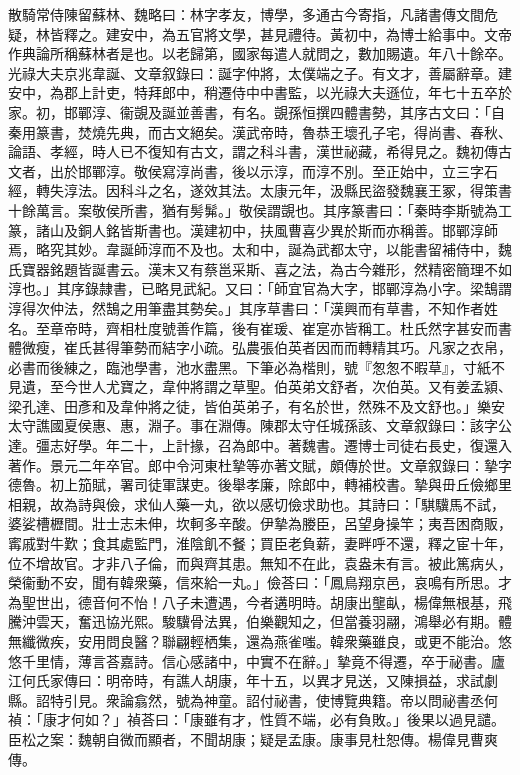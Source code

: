 \begin{pinyinscope}
散騎常侍陳留蘇林、魏略曰：林字孝友，博學，多通古今寄指，凡諸書傳文間危疑，林皆釋之。建安中，為五官將文學，甚見禮待。黃初中，為博士給事中。文帝作典論所稱蘇林者是也。以老歸第，國家每遣人就問之，數加賜遺。年八十餘卒。光祿大夫京兆韋誕、文章叙錄曰：誕字仲將，太僕端之子。有文才，善屬辭章。建安中，為郡上計吏，特拜郎中，稍遷侍中中書監，以光祿大夫遜位，年七十五卒於家。初，邯鄲淳、衞覬及誕並善書，有名。覬孫恒撰四體書勢，其序古文曰：「自秦用篆書，焚燒先典，而古文絕矣。漢武帝時，魯恭王壞孔子宅，得尚書、春秋、論語、孝經，時人已不復知有古文，謂之科斗書，漢世祕藏，希得見之。魏初傳古文者，出於邯鄲淳。敬侯寫淳尚書，後以示淳，而淳不別。至正始中，立三字石經，轉失淳法。因科斗之名，遂效其法。太康元年，汲縣民盜發魏襄王冢，得策書十餘萬言。案敬侯所書，猶有髣髴。」敬侯謂覬也。其序篆書曰：「秦時李斯號為工篆，諸山及銅人銘皆斯書也。漢建初中，扶風曹喜少異於斯而亦稱善。邯鄲淳師焉，略究其妙。韋誕師淳而不及也。太和中，誕為武都太守，以能書留補侍中，魏氏寶器銘題皆誕書云。漢末又有蔡邕采斯、喜之法，為古今雜形，然精密簡理不如淳也。」其序錄隷書，已略見武紀。又曰：「師宜官為大字，邯鄲淳為小字。梁鵠謂淳得次仲法，然鵠之用筆盡其勢矣。」其序草書曰：「漢興而有草書，不知作者姓名。至章帝時，齊相杜度號善作篇，後有崔瑗、崔寔亦皆稱工。杜氏然字甚安而書體微瘦，崔氏甚得筆勢而結字小疏。弘農張伯英者因而而轉精其巧。凡家之衣帛，必書而後練之，臨池學書，池水盡黑。下筆必為楷則，號『怱怱不暇草』，寸紙不見遺，至今世人尤寶之，韋仲將謂之草聖。伯英弟文舒者，次伯英。又有姜孟潁、梁孔達、田彥和及韋仲將之徒，皆伯英弟子，有名於世，然殊不及文舒也。」樂安太守譙國夏侯惠、惠，淵子。事在淵傳。陳郡太守任城孫該、文章叙錄曰：該字公達。彊志好學。年二十，上計掾，召為郎中。著魏書。遷博士司徒右長史，復還入著作。景元二年卒官。郎中令河東杜摯等亦著文賦，頗傳於世。文章叙錄曰：摯字德魯。初上笳賦，署司徒軍謀吏。後舉孝廉，除郎中，轉補校書。摯與毌丘儉鄉里相親，故為詩與儉，求仙人藥一丸，欲以感切儉求助也。其詩曰：「騏驥馬不試，婆娑槽櫪間。壯士志未伸，坎軻多辛酸。伊摯為媵臣，呂望身操竿；夷吾困商販，寗戚對牛歎；食其處監門，淮陰飢不餐；買臣老負薪，妻畔呼不還，釋之宦十年，位不增故官。才非八子倫，而與齊其患。無知不在此，袁盎未有言。被此篤病乆，榮衞動不安，聞有韓衆藥，信來給一丸。」儉荅曰：「鳳鳥翔京邑，哀鳴有所思。才為聖世出，德音何不怡！八子未遭遇，今者遘明時。胡康出壟畒，楊偉無根基，飛騰沖雲天，奮迅協光熙。駿驥骨法異，伯樂觀知之，但當養羽翮，鴻舉必有期。體無纖微疾，安用問良醫？聯翩輕栖集，還為燕雀嗤。韓衆藥雖良，或更不能治。悠悠千里情，薄言荅嘉詩。信心感諸中，中實不在辭。」摯竟不得遷，卒于祕書。廬江何氏家傳曰：明帝時，有譙人胡康，年十五，以異才見送，又陳損益，求試劇縣。詔特引見。衆論翕然，號為神童。詔付祕書，使博覽典籍。帝以問祕書丞何禎：「康才何如？」禎荅曰：「康雖有才，性質不端，必有負敗。」後果以過見譴。臣松之案：魏朝自微而顯者，不聞胡康；疑是孟康。康事見杜恕傳。楊偉見曹爽傳。


\end{pinyinscope}